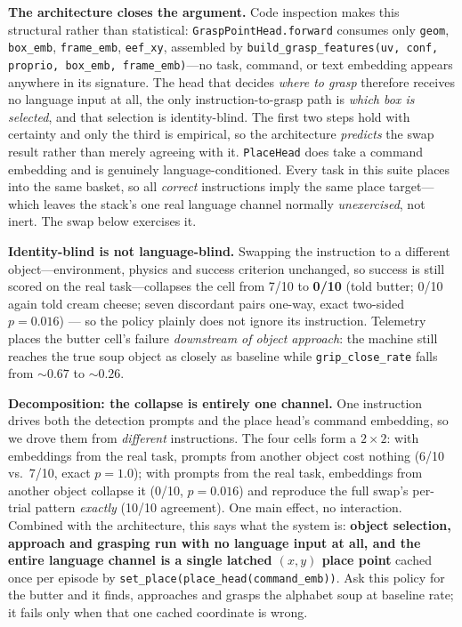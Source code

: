 \documentclass[10pt,letterpaper]{article}
\begin{document}
\noindent \textbf{The architecture closes the argument.} Code inspection makes
this structural rather than statistical: \texttt{GraspPointHead.forward}
consumes only \texttt{geom}, \texttt{box\_emb}, \texttt{frame\_emb},
\texttt{eef\_xy}, assembled by
\texttt{build\_grasp\_features(uv, conf, proprio, box\_emb, frame\_emb)}---no
task, command, or text embedding appears anywhere in its signature. The head
that decides \emph{where to grasp} therefore receives no language input at all,
the only instruction-to-grasp path is \emph{which box is selected}, and that
selection is identity-blind. The first two steps hold with certainty and only
the third is empirical, so the architecture \emph{predicts} the swap result
rather than merely agreeing with it. \texttt{PlaceHead} does take a command
embedding and is genuinely language-conditioned. Every task in this suite
places into the same basket, so all \emph{correct} instructions imply the same
place target---which leaves the stack's one real language channel normally
\emph{unexercised}, not inert. The swap below exercises it.

\noindent \textbf{Identity-blind is not language-blind.} Swapping the
instruction to a different object---environment, physics and success criterion
unchanged, so success is still scored on the real task---collapses the cell
from 7/10 to \textbf{0/10} (told butter; 0/10 again told cream cheese; seven
discordant pairs one-way, exact two-sided $p=0.016$) --- so the policy plainly
does not ignore its instruction. Telemetry places the butter cell's failure \emph{downstream of
object approach}: the machine still reaches the true soup object as closely as
baseline while \texttt{grip\_close\_rate} falls from ${\sim}0.67$ to
${\sim}0.26$.

\noindent \textbf{Decomposition: the collapse is entirely one channel.} One
instruction drives both the detection prompts and the place head's command
embedding, so we drove them from \emph{different} instructions. The four cells
form a $2\times2$: with embeddings from the real task, prompts from another
object cost nothing (6/10 vs.\ 7/10, exact $p=1.0$); with prompts from the real
task, embeddings from another object collapse it (0/10, $p=0.016$) and
reproduce the full swap's per-trial pattern \emph{exactly} (10/10 agreement).
One main effect, no interaction. Combined with the architecture, this says what
the system is: \textbf{object selection, approach and grasping run with no
language input at all, and the entire language channel is a single latched
$(x,y)$ place point} cached once per episode by
\texttt{set\_place(place\_head(command\_emb))}. Ask this policy for the butter
and it finds, approaches and grasps the alphabet soup at baseline rate; it
fails only when that one cached coordinate is wrong.
\end{document}
